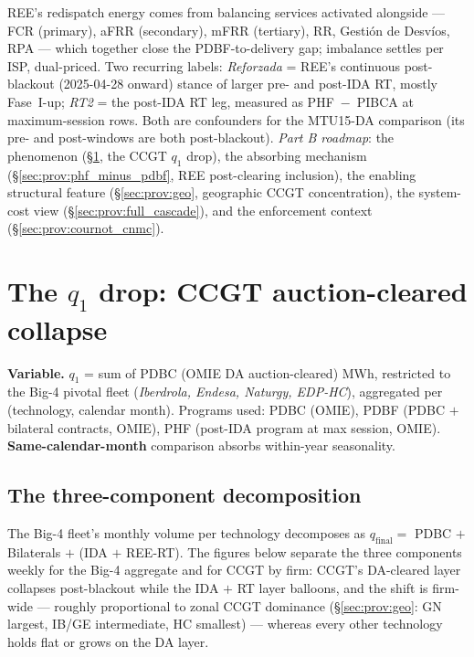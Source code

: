 \documentclass[11pt,a4paper]{article}
\begin{document}
\noindent REE's redispatch energy comes from balancing services activated alongside --- FCR (primary), aFRR (secondary), mFRR (tertiary), RR, Gestión de Desvíos, RPA --- which together close the PDBF-to-delivery gap; imbalance settles per ISP, dual-priced. Two recurring labels: \emph{Reforzada} = REE's continuous post-blackout (2025-04-28 onward) stance of larger pre- and post-IDA RT, mostly Fase~I-up; \emph{RT2} = the post-IDA RT leg, measured as PHF~$-$~PIBCA at maximum-session rows. Both are confounders for the MTU15-DA comparison (its pre- and post-windows are both post-blackout). \emph{Part B roadmap}: the phenomenon (\S\ref{sec:prov:q1_drop}, the CCGT $q_1$ drop), the absorbing mechanism (\S\ref{sec:prov:phf_minus_pdbf}, REE post-clearing inclusion), the enabling structural feature (\S\ref{sec:prov:geo}, geographic CCGT concentration), the system-cost view (\S\ref{sec:prov:full_cascade}), and the enforcement context (\S\ref{sec:prov:cournot_cnmc}).

\section{The $q_1$ drop: CCGT auction-cleared collapse}\label{sec:prov:q1_drop}

\textbf{Variable.} $q_1$ = sum of PDBC (OMIE DA auction-cleared) MWh, restricted to the Big-4 pivotal fleet (\emph{Iberdrola, Endesa, Naturgy, EDP-HC}), aggregated per (technology, calendar month). Programs used: PDBC (OMIE), PDBF (PDBC $+$ bilateral contracts, OMIE), PHF (post-IDA program at max session, OMIE). \textbf{Same-calendar-month} comparison absorbs within-year seasonality.

\subsection{The three-component decomposition}\label{sec:prov:q1_drop:components}

\noindent The Big-4 fleet's monthly volume per technology decomposes as $q_{\text{final}} = $ PDBC $+$ Bilaterals $+$ (IDA $+$ REE-RT). The figures below separate the three components weekly for the Big-4 aggregate and for CCGT by firm: CCGT's DA-cleared layer collapses post-blackout while the IDA $+$ RT layer balloons, and the shift is firm-wide --- roughly proportional to zonal CCGT dominance (\S\ref{sec:prov:geo}: GN largest, IB/GE intermediate, HC smallest) --- whereas every other technology holds flat or grows on the DA layer.
\end{document}
